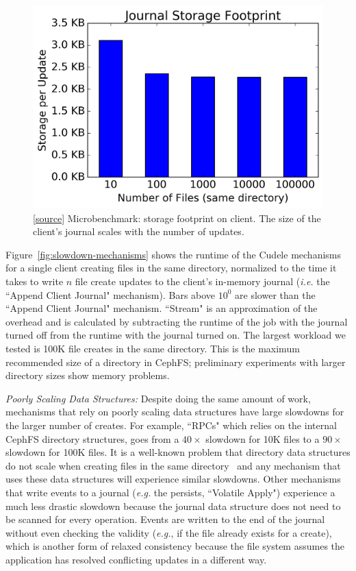 \begin{figure}[tb]
\centering
\includegraphics[width=1.0\linewidth]{graphs/behavior-journal-size.png}
\caption{ [\href{https://...}{source}] Microbenchmark: storage footprint on
client. The size of the client's journal scales with the number of
updates.\label{fig:behavior-journal-size}}
\end{figure}

Figure~\ref{fig:slowdown-mechanisms} shows the runtime of the Cudele
mechanisms for a single client creating files in the same directory, normalized
to the time it takes to write \(n\) file create updates to the client's
in-memory journal ({\it i.e.} the ``Append Client Journal" mechanism). Bars
above \(10^0\) are slower than the ``Append Client Journal" mechanism.
``Stream" is an approximation of the overhead and is calculated by subtracting
the runtime of the job with the journal turned off from the runtime with the
journal turned on.  The largest workload we tested is 100K file creates in the
same directory.  This is the maximum recommended size of a directory in CephFS;
preliminary experiments with larger directory sizes show memory problems.

{\it Poorly Scaling Data Structures:} Despite doing the same amount of
work, mechanisms that rely on poorly scaling data structures have large
slowdowns for the larger number of creates. For example, ``RPCs" which relies
on the internal CephFS directory structures, goes from a \(40\times\) slowdown
for 10K files to a \(90\times\) slowdown for 100K files. It is a well-known
problem that directory data structures do not scale when creating files in the
same directory~\cite{ren:sc2014-indexfs} and any mechanism that uses these data
structures will experience similar slowdowns. Other mechanisms that write
events to a journal ({\it e.g.} the persists, ``Volatile Apply") experience a
much less drastic slowdown because the journal data structure does not need to
be scanned for every operation. Events are written to the end of the journal without
even checking the validity ({\it e.g.}, if the file already exists for a create),
which is another form of relaxed consistency because the file system assumes the
application has resolved conflicting updates in a different way.

